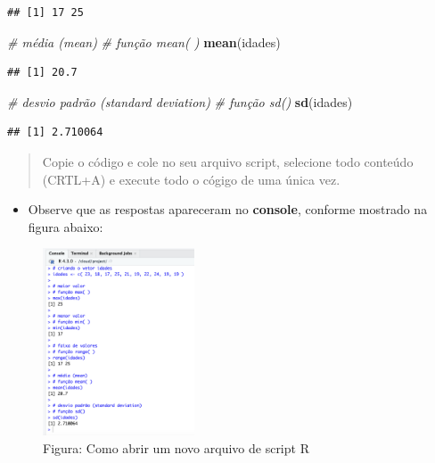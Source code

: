 \documentclass[
]{book}
\newenvironment{Shaded}{\begin{snugshade}}{\end{snugshade}}
\newcommand{\CommentTok}[1]{\textcolor[rgb]{0.56,0.35,0.01}{\textit{#1}}}
\newcommand{\FunctionTok}[1]{\textcolor[rgb]{0.13,0.29,0.53}{\textbf{#1}}}
\newcommand{\NormalTok}[1]{#1}
\providecommand{\tightlist}{%
  \setlength{\itemsep}{0pt}\setlength{\parskip}{0pt}}
\begin{document}
\begin{verbatim}
## [1] 17 25
\end{verbatim}

\begin{Shaded}
\begin{Highlighting}[]
\CommentTok{\# média (mean)}
\CommentTok{\# função mean( )}
\FunctionTok{mean}\NormalTok{(idades)}
\end{Highlighting}
\end{Shaded}

\begin{verbatim}
## [1] 20.7
\end{verbatim}

\begin{Shaded}
\begin{Highlighting}[]
\CommentTok{\# desvio padrão (standard deviation)}
\CommentTok{\# função sd() }
\FunctionTok{sd}\NormalTok{(idades)}
\end{Highlighting}
\end{Shaded}

\begin{verbatim}
## [1] 2.710064
\end{verbatim}

\begin{quote}
Copie o código e cole no seu arquivo script, selecione todo conteúdo (CRTL+A) e execute todo o cógigo de uma única vez.
\end{quote}

\begin{itemize}
\tightlist
\item
  Observe que as respostas apareceram no \textbf{console}, conforme mostrado na figura abaixo:
\end{itemize}

\begin{figure}
\centering
\includegraphics[width=0.4\textwidth,height=\textheight]{telaRespostaConsole.png}
\caption{Figura: Como abrir um novo arquivo de script R}
\end{figure}
\end{document}
